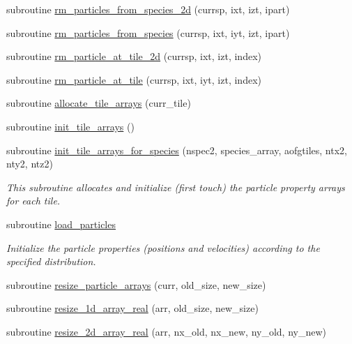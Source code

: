 \begin{DoxyCompactItemize}
\item 
subroutine \hyperlink{namespacetiling_a837e4ff4ce81c945e94ea975a1df6fc1}{rm\+\_\+particles\+\_\+from\+\_\+species\+\_\+2d} (currsp, ixt, izt, ipart)
\item 
subroutine \hyperlink{namespacetiling_a473875b1f5e9bc6b47ff5d088db15e58}{rm\+\_\+particles\+\_\+from\+\_\+species} (currsp, ixt, iyt, izt, ipart)
\item 
subroutine \hyperlink{namespacetiling_ad6083dac6e2eaccb762ecb829c954898}{rm\+\_\+particle\+\_\+at\+\_\+tile\+\_\+2d} (currsp, ixt, izt, index)
\item 
subroutine \hyperlink{namespacetiling_a7657907098a724d053d587ca73725958}{rm\+\_\+particle\+\_\+at\+\_\+tile} (currsp, ixt, iyt, izt, index)
\item 
subroutine \hyperlink{namespacetiling_aacbab18e61ac532ba396b41bab67a265}{allocate\+\_\+tile\+\_\+arrays} (curr\+\_\+tile)
\item 
subroutine \hyperlink{namespacetiling_a97b828159c1e05df8082c27f3aa61e13}{init\+\_\+tile\+\_\+arrays} ()
\item 
subroutine \hyperlink{namespacetiling_afe5a0a0a27fa1c078f8e69228d0d4a56}{init\+\_\+tile\+\_\+arrays\+\_\+for\+\_\+species} (nspec2, species\+\_\+array, aofgtiles, ntx2, nty2, ntz2)
\begin{DoxyCompactList}\small\item\em This subroutine allocates and initialize (first touch) the particle property arrays for each tile. \end{DoxyCompactList}\item 
subroutine \hyperlink{namespacetiling_ae5c4e98ae7e7957054dda03ab0e298f8}{load\+\_\+particles}
\begin{DoxyCompactList}\small\item\em Initialize the particle properties (positions and velocities) according to the specified distribution. \end{DoxyCompactList}\item 
subroutine \hyperlink{namespacetiling_aaa407b13d58fff3e54b191fa9a8962c0}{resize\+\_\+particle\+\_\+arrays} (curr, old\+\_\+size, new\+\_\+size)
\item 
subroutine \hyperlink{namespacetiling_ad65e35a84d2268ef2b6b4f97f38b18bc}{resize\+\_\+1d\+\_\+array\+\_\+real} (arr, old\+\_\+size, new\+\_\+size)
\item 
subroutine \hyperlink{namespacetiling_afa3d754a121460dce786357819629421}{resize\+\_\+2d\+\_\+array\+\_\+real} (arr, nx\+\_\+old, nx\+\_\+new, ny\+\_\+old, ny\+\_\+new)

\end{DoxyCompactItemize}
